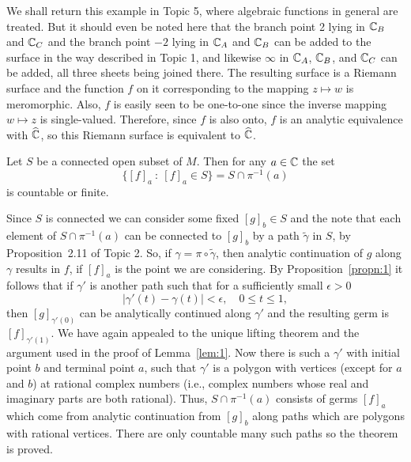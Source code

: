 \documentclass[a4paper,11pt]{article}
\begin{document}
We shall return this example in Topic 5, where algebraic functions
in general are treated.  But it should even be noted here that the
branch point 2 lying in ${\mathbb C}_B$ and ${\mathbb C}_C$ and the branch point
$-2$ lying in ${\mathbb C}_A$ and ${\mathbb C}_B$ can be added to the surface in the
way described in Topic 1, and likewise $\infty$ in ${\mathbb C}_A$,
${\mathbb C}_B$,  and ${\mathbb C}_C$ can be added, all three sheets being joined
there.  The resulting surface is a Riemann surface and the function
$f$ on it corresponding to the mapping $z \mapsto w$ is meromorphic.
Also, $f$ is easily seen to be one-to-one since the inverse mapping $w
\mapsto z$ is single-valued.  Therefore, since $f$ is also onto, $f$
is an analytic equivalence with $\widehat{{\mathbb C}}$, so this Riemann
surface is equivalent to $\widehat{{\mathbb C}}$.

\begin{thm}
  Let $S$ be a connected open subset of $M$.  Then for any $a \in
  {\mathbb C}$ the set
  $$
  \{[f]_a ~:~ [f]_a \in S\} = S \cap \pi^{-1}(a)
  $$
  is countable or finite.  
\end{thm}

\begin{myproof}
  Since $S$ is connected we can consider some fixed $[g]_b \in S$ and
  the note that each element of $S\cap \pi^{-1}(a)$ can be connected
  to $[g]_b$ by a path $\widetilde{\gamma}$ in $S$, by
  Proposition~2.11 of Topic 2.  So, if $\gamma = \pi \circ
  \widetilde{\gamma}$, then analytic continuation of $g$ along
  $\gamma$ results in $f$, if $[f]_a$ is the point we are
  considering.  By Proposition~\ref{propn:1} it follows that if
  $\gamma'$ is another path such that for a sufficiently small
  $\epsilon > 0$
  $$
  | \gamma'(t) - \gamma(t) | < \epsilon, \quad 0 \le t \le 1,
  $$
  then $[g]_{\gamma'(0)}$ can be analytically continued along
  $\gamma'$ and the resulting germ is $[f]_{\gamma'(1)}$.  We have
  again appealed to the unique lifting theorem and the argument used
  in the proof of Lemma~\ref{lem:1}.  Now there is such a $\gamma'$
  with initial point $b$ and terminal point $a$, such that $\gamma'$
  is a polygon with vertices (except for $a$ and $b$) at rational
  complex numbers (i.e., complex numbers whose real and imaginary
  parts are both rational).  Thus, $S \cap \pi^{-1}(a)$ consists of
  germs $[f]_a$ which come from analytic continuation from $[g]_b$
  along paths which are polygons with rational vertices.  There are
  only countable many such paths so the theorem is proved.
\end{myproof}
\end{document}

